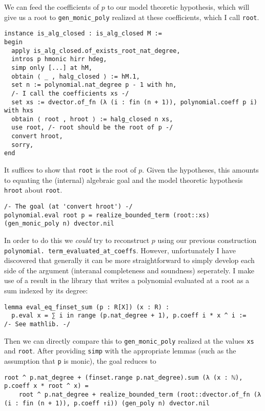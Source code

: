 We can feed the coefficients of $p$ to our model theoretic hypothesis,
which will give us a root to \texttt{gen\_monic\_poly}
realized at these coefficients, which I call \texttt{root}.

\begin{lstlisting}
instance is_alg_closed : is_alg_closed M :=
begin
  apply is_alg_closed.of_exists_root_nat_degree,
  intros p hmonic hirr hdeg,
  simp only [...] at hM,
  obtain ⟨ _ , halg_closed ⟩ := hM.1,
  set n := polynomial.nat_degree p - 1 with hn,
  /- I call the coefficients xs -/
  set xs := dvector.of_fn (λ (i : fin (n + 1)), polynomial.coeff p i) with hxs
  obtain ⟨ root , hroot ⟩ := halg_closed n xs,
  use root, /- root should be the root of p -/
  convert hroot,
  sorry,
end
\end{lstlisting}

It suffices to show that \texttt{root} is the root of $p$.
Given the hypotheses, this amounts to equating the (internal) algebraic goal
and the model theoretic hypothesis \texttt{hroot} about \texttt{root}.

\begin{lstlisting}
/- The goal (at 'convert hroot') -/
polynomial.eval root p = realize_bounded_term (root::xs) (gen_monic_poly n) dvector.nil\end{lstlisting}

In order to do this we \textit{could} try to reconstruct $p$
using our previous construction \texttt{polynomial. term\_evaluated\_at\_coeffs}.
However, unfortunately I have discovered that generally it can be
more straightforward to simply develop each side of the argument
(interanal completeness and soundness) seperately.
I make use of a result in the library that writes a polynomial
evaluated at a root as a sum indexed by its degree:

\begin{lstlisting}
lemma eval_eq_finset_sum (p : R[X]) (x : R) :
  p.eval x = ∑ i in range (p.nat_degree + 1), p.coeff i * x ^ i :=
/- See mathlib. -/
\end{lstlisting}

Then we can directly compare this to \texttt{gen\_monic\_poly} realized
at the values \texttt{xs} and \texttt{root}.
After providing \texttt{simp} with the appropriate lemmas
(such as the assumption that \texttt{p} is monic),
the goal reduces to

\begin{lstlisting}
root ^ p.nat_degree + (finset.range p.nat_degree).sum (λ (x : ℕ), p.coeff x * root ^ x) =
    root ^ p.nat_degree + realize_bounded_term (root::dvector.of_fn (λ (i : fin (n + 1)), p.coeff ↑i)) (gen_poly n) dvector.nil\end{lstlisting}

